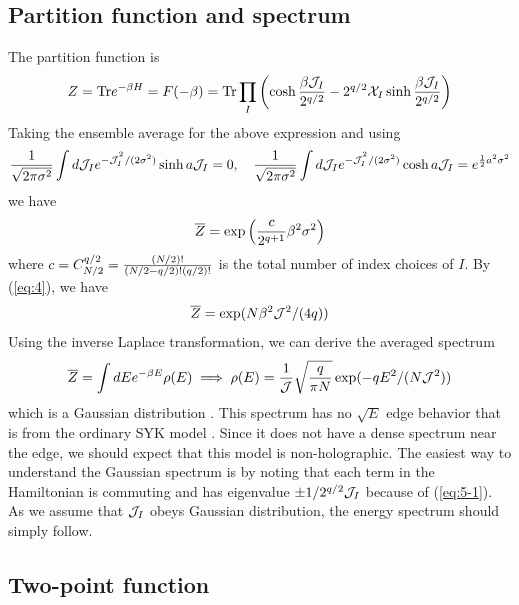 \documentclass[11pt]{article}
\renewcommand{\>}{\rangle}
\newcommand{\<}{\langle}
\begin{document}
\subsection{Partition function and spectrum}

The partition function is
\begin{equation}
Z=\text{Tr} e^{-\beta H}=F(-\beta)=\text{Tr}\prod_{I}\left(\cosh\frac{\beta\mathcal{J}_{I}}{2^{q/2}}-2^{q/2}\mathcal{X}_{I}\sinh\frac{\beta\mathcal{J}_{I}}{2^{q/2}}\right)
\end{equation}
Taking the ensemble average for the above expression and using
\begin{equation}
\frac{1}{\sqrt{2\pi\sigma^{2}}}\int d\mathcal{J}_{I}e^{-\mathcal{J}_{I}^{^{2}}/(2\sigma^{2})}\sinh a\mathcal{J}_{I}=0,\quad\frac{1}{\sqrt{2\pi\sigma^{2}}}\int d\mathcal{J}_{I}e^{-\mathcal{J}_{I}^{^{2}}/(2\sigma^{2})}\cosh a\mathcal{J}_{I}=e^{\frac{1}{2}a^{2}\sigma^{2}}\label{eq:14}
\end{equation}
we have
\begin{equation}
\overline{Z}=\exp\left(\frac{c}{2^{q+1}}\beta^{2}\sigma^{2}\right)
\end{equation}
where $c=C_{N/2}^{q/2}=\frac{(N/2)!}{(N/2-q/2)!(q/2)!}$ is the total
number of index choices of $I$. By (\ref{eq:4}), we have
\begin{equation}
\overline{Z}=\exp(N\beta^{2}\mathcal{J}^{2}/(4q))\label{eq:14-1}
\end{equation}
Using the inverse Laplace transformation, we can derive the averaged
spectrum
\begin{equation}
\overline{Z}=\int dEe^{-\beta E}\rho(E)\implies\rho(E)=\frac{1}{\mathcal{J}}\sqrt{\frac{q}{\pi N}}\exp(-qE^{2}/(N\mathcal{J}^{2}))
\end{equation}
which is a Gaussian distribution \cite{derrida1980random}. This spectrum has no $\sqrt{E}$
edge behavior that is from the ordinary SYK model \cite{Garcia-Garcia:2016mno, Maldacena:2016hyu}. Since it does not have
a dense spectrum near the edge, we should expect that this model is
non-holographic. The easiest way to understand the Gaussian spectrum
is by noting that each term in the Hamiltonian is commuting and has
eigenvalue $\pm1/2^{q/2}\mathcal{J}_{I}$ because of (\ref{eq:5-1}). As we
assume that $\mathcal{J}_{I}$ obeys Gaussian distribution, the energy spectrum
should simply follow.

\subsection{Two-point function}
\end{document}
